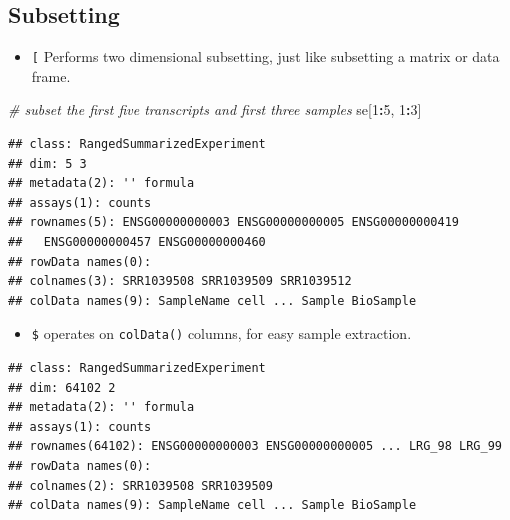 \documentclass[]{article}
\newenvironment{Shaded}{\begin{snugshade}}{\end{snugshade}}
\newcommand{\CommentTok}[1]{\textcolor[rgb]{0.56,0.35,0.01}{\textit{#1}}}
\newcommand{\DecValTok}[1]{\textcolor[rgb]{0.00,0.00,0.81}{#1}}
\newcommand{\NormalTok}[1]{#1}
\newcommand{\OperatorTok}[1]{\textcolor[rgb]{0.81,0.36,0.00}{\textbf{#1}}}
\newcommand{\StringTok}[1]{\textcolor[rgb]{0.31,0.60,0.02}{#1}}
\providecommand{\tightlist}{%
  \setlength{\itemsep}{0pt}\setlength{\parskip}{0pt}}
\begin{document}
\hypertarget{subsetting}{%
\subsection{Subsetting}\label{subsetting}}

\begin{itemize}
\tightlist
\item
  \texttt{{[}} Performs two dimensional subsetting, just like subsetting
  a matrix or data frame.
\end{itemize}

\begin{Shaded}
\begin{Highlighting}[]
\CommentTok{# subset the first five transcripts and first three samples}
\NormalTok{se[}\DecValTok{1}\OperatorTok{:}\DecValTok{5}\NormalTok{, }\DecValTok{1}\OperatorTok{:}\DecValTok{3}\NormalTok{]}
\end{Highlighting}
\end{Shaded}

\begin{verbatim}
## class: RangedSummarizedExperiment 
## dim: 5 3 
## metadata(2): '' formula
## assays(1): counts
## rownames(5): ENSG00000000003 ENSG00000000005 ENSG00000000419
##   ENSG00000000457 ENSG00000000460
## rowData names(0):
## colnames(3): SRR1039508 SRR1039509 SRR1039512
## colData names(9): SampleName cell ... Sample BioSample
\end{verbatim}

\begin{itemize}
\tightlist
\item
  \texttt{\$} operates on \texttt{colData()} columns, for easy sample
  extraction.
\end{itemize}

\begin{Shaded}
\end{Shaded}

\begin{verbatim}
## class: RangedSummarizedExperiment 
## dim: 64102 2 
## metadata(2): '' formula
## assays(1): counts
## rownames(64102): ENSG00000000003 ENSG00000000005 ... LRG_98 LRG_99
## rowData names(0):
## colnames(2): SRR1039508 SRR1039509
## colData names(9): SampleName cell ... Sample BioSample
\end{verbatim}
\end{document}
